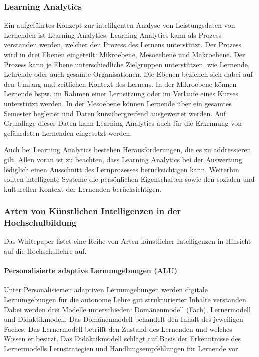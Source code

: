 \subsubsection*{Learning Analytics}
Ein aufgeführtes Konzept zur intelilgenten Analyse von Leistungsdaten von Lernenden ist Learning Analytics. Learning Analytics kann als Prozess verstanden werden, welcher den Prozess des Lernens unterstützt. Der Prozess wird in drei Ebenen eingeteilt: Mikroebene, Mesoeebene und Makroebene. Der Prozess kann je Ebene unterschiedliche Zielgruppen unterstützen, wie Lernende, Lehrende oder auch gesamte Organisationen. Die Ebenen beziehen sich dabei auf den Umfang und zeitlichen Kontext des Lernens. In der Mikroebene können Lernende bspw. im Rahmen einer Lernsitzung oder im Verlaufe eines Kurses unterstützt werden. In der Mesoebene können Lernende über ein gesamtes Semester begleitet und Daten kursübergreifend ausgewertet werden. Auf Grundlage dieser Daten kann Learning Analytics auch für die Erkennung von gefährdeten Lernenden eingesetzt werden.

Auch bei Learning Analytics bestehen Herausforderungen, die es zu addressieren gilt. Allen voran ist zu beachten, dass Learning Analytics bei der Auswertung lediglich einen Ausschnitt des Lernprozesses berücksichtigen kann. Weiterhin sollten intelligente Systeme die persönlichen Eigenschaften sowie den sozialen und kulturellen Kontext der Lernenden berücksichtigen.

\subsubsection*{Arten von Künstlichen Intelligenzen in der Hochschulbildung}
Das Whitepaper listet eine Reihe von Arten künstlicher Intelligenzen in Hinsicht auf die Hochschullehre auf.
\paragraph*{Personalisierte adaptive Lernumgebungen (ALU)}
Unter Personalisierten adaptiven Lernumgebungen werden digitale Lernumgebungen für die autonome Lehre gut strukturierter Inhalte verstanden. Dabei werden drei Modelle unterschieden: Domänenmodell (Fach), Lernermodell und Didaktikmodell. Das Domänenmodell behandelt den Inhalt des jeweiligen Faches. Das Lernermodell betrifft den Zustand des Lernenden und welches Wissen er besitzt. Das Didaktikmodell schlägt auf Basis der Erkenntnisse des Lernermodells Lernstrategien und Handlungsempfehlungen für Lernende vor.

